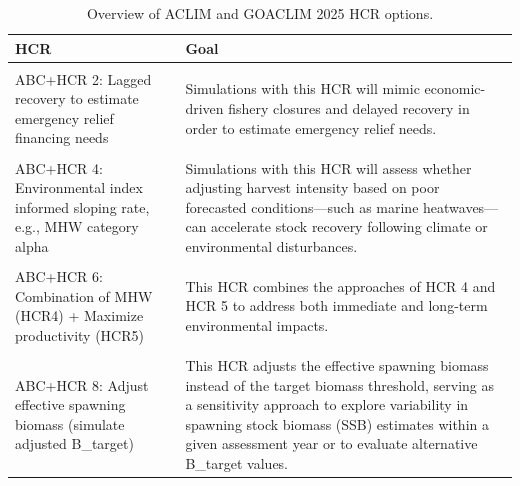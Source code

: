 \documentclass[
]{article}
\begin{document}
\begin{longtable}[t]{>{\raggedright\arraybackslash}p{15em}>{\raggedright\arraybackslash}p{25em}}
\caption{\label{tab:smry}Overview of ACLIM and GOACLIM 2025 HCR options.}\\
\toprule
HCR & Goal\\
\midrule
\cellcolor{gray!10}{ABC+HCR 1: Status quo} & \cellcolor{gray!10}{This HCR is the baseline sloping harvest control rule used for groundfish in Alaska}\\
ABC+HCR 2: Lagged recovery to estimate emergency relief financing needs & Simulations with this HCR will mimic economic-driven fishery closures and delayed recovery in order to estimate emergency relief needs.\\
\cellcolor{gray!10}{ABC+HCR 3: Long-term resilience (stronger reserve) B\_target} & \cellcolor{gray!10}{This HCR aims to enhance long-term stock resilience by adjusting B\_target (as a proportion of unfished biomass)}\\
ABC+HCR 4: Environmental index informed sloping rate, e.g., MHW category alpha & Simulations with this HCR will assess whether adjusting harvest intensity based on poor forecasted conditions—such as marine heatwaves—can accelerate stock recovery following climate or environmental disturbances.\\
\cellcolor{gray!10}{ABC+HCR 5: Maximize productivity/ increased reserve (buffer shocks)} & \cellcolor{gray!10}{HCR 5 is designed to maximize ecosystem and spawning biomass productivity by increasing reserves, creating a buffer against environmental shocks and enhancing long-term sustainability.}\\
\addlinespace
ABC+HCR 6: Combination of MHW (HCR4) + Maximize productivity (HCR5) & This HCR combines the approaches of HCR 4 and HCR 5 to address both immediate and long-term environmental impacts.\\
\cellcolor{gray!10}{ABC+HCR 7: Risk Table Bridging: R/S variability covariate adjusted HCR} & \cellcolor{gray!10}{This HCR provides a way to transition from qualitative risk tables to a more explicit, analytical approach for species whose productivity is known to vary with environmental conditions.}\\
ABC+HCR 8: Adjust effective spawning biomass (simulate adjusted B\_target) & This HCR adjusts the effective spawning biomass instead of the target biomass threshold, serving as a sensitivity approach to explore variability in spawning stock biomass (SSB) estimates within a given assessment year or to evaluate alternative B\_target values.\\

\end{longtable}
\end{document}
